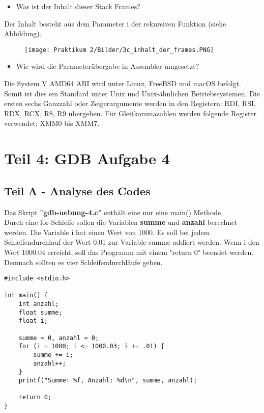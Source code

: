 \documentclass[12pt]{article}
\begin{document}
\begin{itemize}
  \item Was ist der Inhalt dieser Stack Frames?
\end{itemize}

Der Inhalt besteht aus dem Parameter i der rekursiven Funktion (siehe Abbildung).
\begin{figure}[htbp]
    \centering
    \texttt{[image: Praktikum 2/Bilder/3c\_inhalt\_der\_frames.PNG]}
\end{figure}

\begin{itemize}
  \item Wie wird die Parameterübergabe in Assembler umgesetzt?
\end{itemize}

Die System V AMD64 ABI wird unter Linux, FreeBSD und macOS befolgt. Somit ist dies ein Standard unter Unix und Unix-ähnlichen Betriebssystemen. Die ersten sechs Ganzzahl oder Zeigerargumente werden in den Registern: RDI, RSI, RDX, RCX, R8, R9 übergeben. Für Gleitkommazahlen werden folgende Register verwendet: XMM0 bis XMM7.

\newpage

\section{Teil 4: GDB Aufgabe 4}
\subsection{Teil A - Analyse des Codes}
Das Skript \textbf{"gdb-uebung-4.c"} enthält eine nur eine main() Methode.\\
Durch eine for-Schleife sollen die Variablen \textbf{summe} und \textbf{anzahl} berechnet werden. Die Variable i hat einen Wert von 1000. Es soll bei jedem Schleifendurchlauf der Wert 0.01 zur Variable summe addiert werden. Wenn i den Wert 1000.04 erreicht, soll das Programm mit einem "return 0" beendet werden. Demnach sollten es vier Schleifendurchläufe geben.

\begin{lstlisting}
#include <stdio.h>

int main() {
    int anzahl;
    float summe;
    float i;

    summe = 0, anzahl = 0;
    for (i = 1000; i <= 1000.03; i += .01) {
        summe += i;
        anzahl++;
    }
    printf("Summe: %f, Anzahl: %d\n", summe, anzahl);

    return 0;
}
\end{lstlisting}
\end{document}

